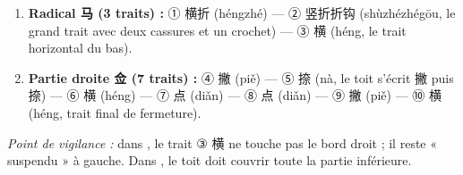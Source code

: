 \documentclass[11pt]{article}
\newcommand{\zh}[1]{\ifmmode\text{#1}\else{#1}\fi}
\begin{document}
\begin{propriete}
\begin{enumerate}
    \item \textbf{Radical 马 (3 traits) :} ① 横折 (héngzhé) — ② 竖折折钩 (shùzhézhégōu, le grand trait avec deux cassures et un crochet) — ③ 横 (héng, le trait horizontal du bas).
    \item \textbf{Partie droite 佥 (7 traits) :} ④ 撇 (piě) — ⑤ 捺 (nà, le toit \zh{人} s'écrit 撇 puis 捺) — ⑥ 横 (héng) — ⑦ 点 (diǎn) — ⑧ 点 (diǎn) — ⑨ 撇 (piě) — ⑩ 横 (héng, trait final de fermeture).
\end{enumerate}
\emph{Point de vigilance :} dans \zh{马}, le trait ③ 横 ne touche pas le bord droit ; il reste « suspendu » à gauche. Dans \zh{佥}, le toit \zh{人} doit couvrir toute la partie inférieure.
\end{propriete}
\end{document}
